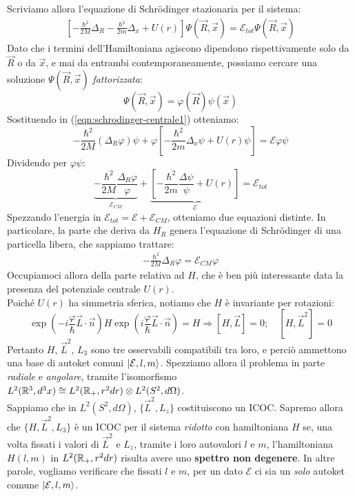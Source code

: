 \documentclass[../../FisicaTeorica.tex]{subfiles}
\begin{document}
Scriviamo allora l'equazione di Schr\"odinger stazionaria per il sistema:
\begin{align}
\left[-\frac{\hbar^2}{2M}\Delta_R - \frac{\hbar^2}{2m}\Delta_x + U(r)\right]\Psi(\vec{R},\vec{x})=\mathcal{E}_{tot}\Psi(\vec{R},\vec{x})
\label{eqn:schrodinger-centrale1}
\end{align}
Dato che i termini dell'Hamiltoniana agiscono dipendono rispettivamente solo da $\vec{R}$ o da $\vec{x}$, e mai da entrambi contemporaneamente, possiamo cercare una soluzione $\Psi(\vec{R},\vec{x})$ \textit{fattorizzata}:
\[
\Psi(\vec{R},\vec{x})=\varphi(\vec{R})\psi(\vec{x})
\]
Sostituendo in (\ref{eqn:schrodinger-centrale1}) otteniamo:
\[
-\frac{\hbar^2}{2M}(\Delta_R \varphi)\psi +\varphi\left[ -\frac{\hbar^2}{2m}\Delta_x \psi + U(r)\psi\right] = \mathcal{E}\varphi\psi
\]
Dividendo per $\varphi\psi$:
\[
\underbrace{-\frac{\hbar^2}{2M}\frac{\Delta_R \varphi}{\varphi}}_{\mathcal{E}_{CM}}+\underbrace{\left[
-\frac{\hbar^2}{2m} \frac{\Delta\psi}{\psi} + U(r)
\right]}_{\mathcal{E}} = \mathcal{E}_{tot}
\]
Spezzando l'energia in $\mathcal{E}_{tot}=\mathcal{E}+\mathcal{E}_{CM}$, otteniamo due equazioni distinte. In particolare, la parte che deriva da $H_R$ genera l'equazione di Schr\"odinger di una particella libera, che sappiamo trattare:
\begin{align*}
-\frac{\hbar^2}{2M}\Delta_R\varphi = \mathcal{E}_{CM}\varphi
\end{align*}
Occupiamoci allora della parte relativa ad $H$, che è ben più interessante data la presenza del potenziale centrale $U(r)$.\\

Poiché $U(r)$ ha simmetria sferica, notiamo che $H$ è invariante per rotazioni:
\[
\exp\left(-i\frac{\varphi}{\hbar}\vec{L}\cdot\vec{n}\right) H \exp\left(i\frac{\varphi}{\hbar}\vec{L}\cdot \vec{n}\right) = H \Rightarrow [H, \vec{L}]=0; \quad [H,\vec{L}^2]=0
\]
Pertanto $H$, $\vec{L}^2$, $L_3$ sono tre osservabili compatibili tra loro, e perciò ammettono una base di autoket comuni $\Ket{\mathcal{E}, l, m}$. Spezziamo allora il problema in parte \textit{radiale} e \textit{angolare}, tramite l'isomorfismo  $L^2(\mathbb{R}^3,d^3x) \cong L^2(\mathbb{R}_+, r^2 dr) \otimes L^2(S^2, d\Omega)$.\\
Sappiamo che in $L^2(S^2, d\Omega)$, $\{\vec{L}^2, L_z\}$ costituiscono un ICOC. Sapremo allora che $\{H,\vec{L}^2, L_3\}$ è un ICOC per il sistema \textit{ridotto} con hamiltoniana $H$ se, una volta fissati i valori di $\vec{L}^2$ e $L_z$, tramite i loro autovalori $l$ e $m$, l'hamiltoniana $H(l,m)$ in $L^2(\mathbb{R}_+, r^2 dr)$ risulta avere uno \textbf{spettro non degenere}. In altre parole, vogliamo verificare che fissati $l$ e $m$, per un dato $\mathcal{E}$ ci sia un \textit{solo} autoket comune $\Ket{\mathcal{E}, l, m}$.\\
\end{document}
